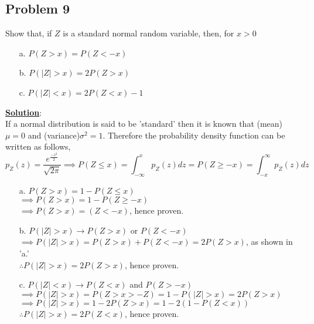 \documentclass[11pt,letter paper]{report}
\begin{document}
\subsection*{Problem 9}
Show that, if $Z$ is a standard normal random variable, then, for $x>0$
\begin{itemize}
\item[a.] $P(Z>x)=P(Z<-x)$
\item[b.] $P(\lvert Z\rvert>x)=2P(Z>x)$
\item[c.] $P(\lvert Z\rvert<x)=2P(Z<x)-1$
\end{itemize}
{\bf \underline{Solution}}:\\
If a normal distribution is said to be 'standard' then it is known that (mean)$\mu=0$ and (variance)$\sigma^2=1$. Therefore the probability density function can be written as follows, 
$$p_Z(z)=\dfrac{e^{\frac{-z^2}{2}}}{\sqrt{2\pi}}\implies P(Z\le x)=\int_{-\infty}^xp_Z(z)dz=P(Z\ge -x)=\int_{-x}^{\infty}p_Z(z)dz$$
\begin{itemize}
\item[a.] $P(Z>x)=1-P(Z\le x)$\\
$\implies P(Z>x)=1-P(Z\ge -x)$\\
$\implies P(Z>x)=(Z<-x)$, hence proven.
\item[b.] $P(\lvert Z\rvert>x)\to P(Z>x)$ or $P(Z<-x)$\\
$\implies P(\lvert Z\rvert>x)=P(Z>x)+P(Z<-x)=2P(Z>x)$, as shown in 'a.'\\
$\therefore P(\lvert Z\rvert>x)=2P(Z>x)$, hence proven.
\item[c.] $P(\lvert Z\rvert<x)\to P(Z<x)$ and $P(Z>-x)$\\
$\implies P(\lvert Z\rvert>x)=P(Z>x>-Z)=1-P(\lvert Z\rvert>x)=2P(Z>x)$\\
$\implies P(\lvert Z\rvert>x)=1-2P(Z>x)=1-2(1-P(Z<x))$\\
$\therefore P(\lvert Z\rvert>x)=2P(Z<x)$, hence proven.
\end{itemize}

\end{document}

